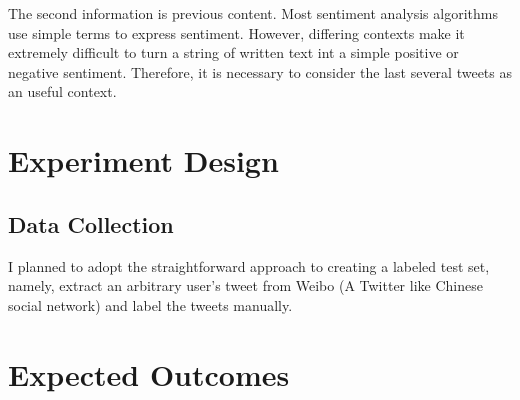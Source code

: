 \documentclass{article}
\begin{document}
The second information is previous content. Most sentiment analysis algorithms use simple terms to express sentiment. However, differing 
contexts make it extremely difficult to turn a string of written text int a simple positive or negative sentiment. Therefore, it is necessary to 
consider the last several tweets as an useful context.
\section*{Experiment Design}
\subsection*{Data Collection}
I planned to adopt the straightforward approach to creating a labeled test set, namely, 
extract an arbitrary user's tweet from Weibo (A Twitter like Chinese social network) and label the tweets manually.
\section*{Expected Outcomes}



\end{document}
